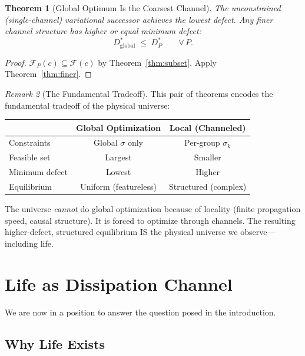 \documentclass[11pt,a4paper]{article}
\theoremstyle{plain}
\newtheorem{theorem}{Theorem}[section]
\theoremstyle{definition}
\theoremstyle{remark}
\newtheorem{remark}[theorem]{Remark}
\newcommand{\F}{\mathcal{F}}
\begin{document}
\begin{theorem}[Global Optimum Is the Coarsest Channel]\label{thm:global}
The unconstrained (single-channel) variational successor achieves the lowest defect.
Any finer channel structure has higher or equal minimum defect:
\[
D^*_{\text{global}} \;\le\; D^*_P \qquad \forall\, P.
\]
\end{theorem}

\begin{proof}
$\F_P(c) \subseteq \F(c)$ by Theorem~\ref{thm:subset}.
Apply Theorem~\ref{thm:finer}.
\end{proof}

\begin{remark}[The Fundamental Tradeoff]
This pair of theorems encodes the fundamental tradeoff of the physical universe:

\begin{center}
\begin{tabular}{@{}lcc@{}}
\toprule
& \textbf{Global Optimization} & \textbf{Local (Channeled)} \\
\midrule
Constraints & Global $\sigma$ only & Per-group $\sigma_k$ \\
Feasible set & Largest & Smaller \\
Minimum defect & Lowest & Higher \\
Equilibrium & Uniform (featureless) & Structured (complex) \\
\bottomrule
\end{tabular}
\end{center}

The universe \emph{cannot} do global optimization because of locality (finite propagation speed, causal structure).
It is forced to optimize through channels.
The resulting higher-defect, structured equilibrium IS the physical universe we observe---including life.
\end{remark}

\section{Life as Dissipation Channel}\label{sec:life}

We are now in a position to answer the question posed in the introduction.

\subsection{Why Life Exists}
\end{document}
